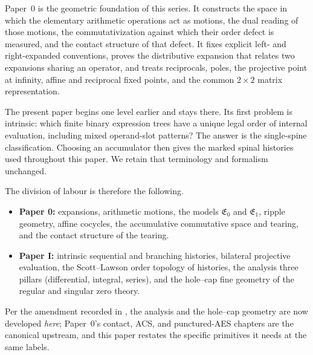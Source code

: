 Paper~0 is the geometric foundation of this series.  It constructs the space in
which the elementary arithmetic operations act as motions, the dual reading of
those motions, the commutativization against which their order defect is
measured, and the contact structure of that defect.  It fixes explicit left- and
right-expanded conventions, proves the distributive expansion that relates two
expansions sharing an operator, and treats reciprocals, poles, the projective
point at infinity, affine and reciprocal fixed points, and the common
$2\times2$ matrix representation.

The present paper begins one level earlier and stays there.  Its first problem
is intrinsic: which finite binary expression trees have a unique legal order of
internal evaluation, including mixed operand-slot patterns?  The answer is the
single-spine classification.  Choosing an accumulator then gives the marked
spinal histories used throughout this paper.  We retain that terminology and
formalism unchanged.

The division of labour is therefore the following.
\begin{itemize}
  \item \textbf{Paper 0:} expansions, arithmetic motions, the models
  $\mathfrak E_0$ and $\mathfrak E_1$, ripple geometry, affine cocycles, the
  accumulative commutative space and tearing, and the contact structure of the
  tearing.
  \item \textbf{Paper I:} intrinsic sequential and branching histories, bilateral
  projective evaluation, the Scott--Lawson order topology of histories, the
  analysis three pillars (differential, integral, series), and the hole--cap
  fine geometry of the regular and singular zero theory.
\end{itemize}
Per the amendment recorded in
, the analysis
and the hole--cap geometry are now developed \emph{here}; Paper~0's contact,
ACS, and punctured-AES chapters are the canonical upstream, and this paper
restates the specific primitives it needs at the same labels.

